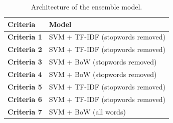 \documentclass[a4paper,twoside,phd]{BYUPhys}
\begin{document}
\begin{table}[H]
	\centering
	
	\begin{tabular}{|p{4.2cm}|p{5cm}|}
		\hline
		
		\textbf{Criteria} & \textbf{Model}                                                                                                                                                                                                                                                                                                                                                    \\
		\hline                                                                                                                                              
		
		\textbf{Criteria 1}  & SVM + TF-IDF (stopwords removed)  \\
		\hline
		
		\textbf{Criteria 2} & SVM + TF-IDF (stopwords removed)  \\
		\hline
		
		\textbf{Criteria 3} & SVM + BoW (stopwords removed) \\
		\hline
		
		\textbf{Criteria 4} & SVM + BoW (stopwords removed) \\
		\hline
		
		\textbf{Criteria 5}  & SVM + TF-IDF (stopwords removed)  \\
		\hline
		
		\textbf{Criteria 6} & SVM + TF-IDF (stopwords removed)  \\
		\hline
		
		\textbf{Criteria 7} & SVM + BoW (all words) \\
		\hline
		                                                   		
	\end{tabular}
	\caption{Architecture of the ensemble model.}
	\label{table:EnsembleModel}
\end{table}
\end{document}
